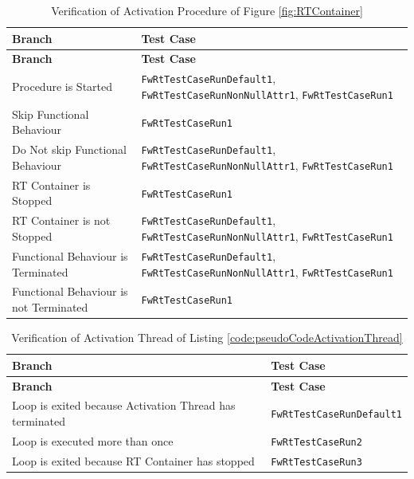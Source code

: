 \documentclass[a4paper,10pt]{article}
\begin{document}
\begin{longtable}{|p{5.7cm}|p{5.5cm}|}
\caption{Verification of Activation Procedure of Figure \ref{fig:RTContainer}}
\label{tab:RT_Activ} \\
\hline
\rowcolor{gray}
\textbf{Branch} & \textbf{Test Case} \\
\hline
\endfirsthead
\rowcolor{gray}
\textbf{Branch} & \textbf{Test Case} \\
\hline
\endhead
Procedure is Started & \texttt{FwRtTestCaseRunDefault1}, \texttt{FwRtTestCaseRunNonNullAttr1}, \texttt{FwRtTestCaseRun1} \\
\hline
Skip Functional Behaviour & \texttt{FwRtTestCaseRun1} \\
\hline
Do Not skip Functional Behaviour & \texttt{FwRtTestCaseRunDefault1}, \texttt{FwRtTestCaseRunNonNullAttr1}, \texttt{FwRtTestCaseRun1} \\
\hline
RT Container is Stopped & \texttt{FwRtTestCaseRun1} \\
\hline
RT Container is not Stopped & \texttt{FwRtTestCaseRunDefault1}, \texttt{FwRtTestCaseRunNonNullAttr1}, \texttt{FwRtTestCaseRun1}\\
\hline
Functional Behaviour is Terminated & \texttt{FwRtTestCaseRunDefault1}, \texttt{FwRtTestCaseRunNonNullAttr1}, \texttt{FwRtTestCaseRun1}\\
\hline
Functional Behaviour is not Terminated & \texttt{FwRtTestCaseRun1}\\
\hline
\end{longtable}

\begin{longtable}{|p{5.7cm}|p{5.5cm}|}
\caption{Verification of Activation Thread of Listing \ref{code:pseudoCodeActivationThread}}
\label{tab:RT_Thread} \\
\hline
\rowcolor{gray}
\textbf{Branch} & \textbf{Test Case} \\
\hline
\endfirsthead
\rowcolor{gray}
\textbf{Branch} & \textbf{Test Case} \\
\hline
\endhead
Loop is exited because Activation Thread has terminated & \texttt{FwRtTestCaseRunDefault1} \\
\hline
Loop is executed more than once & \texttt{FwRtTestCaseRun2} \\
\hline
Loop is exited because RT Container has stopped & \texttt{FwRtTestCaseRun3} \\
\hline
\end{longtable}
\end{document}
